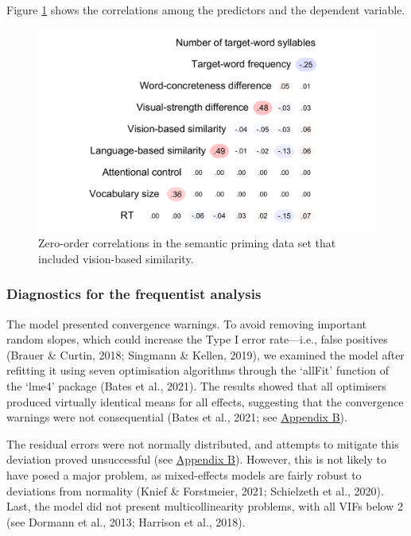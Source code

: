 \documentclass[
  12pt,
  man,floatsintext]{apa7}
\begin{document}
Figure \ref{fig:semanticpriming-with-visualsimilarity-correlations} shows the correlations among the predictors and the dependent variable.

\begin{figure}

{\centering \includegraphics[width=0.73\linewidth]{manuscript_files/figure-latex/semanticpriming-with-visualsimilarity-correlations-1} 

}

\caption{Zero-order correlations in the semantic priming data set that included vision-based similarity.}\label{fig:semanticpriming-with-visualsimilarity-correlations}
\end{figure}

\hypertarget{diagnostics-for-the-frequentist-analysis-1}{%
\subsubsection{Diagnostics for the frequentist analysis}\label{diagnostics-for-the-frequentist-analysis-1}}

The model presented convergence warnings. To avoid removing important random slopes, which could increase the Type I error rate---i.e., false positives (Brauer \& Curtin, 2018; Singmann \& Kellen, 2019), we examined the model after refitting it using seven optimisation algorithms through the `allFit' function of the `lme4' package (Bates et al., 2021). The results showed that all optimisers produced virtually identical means for all effects, suggesting that the convergence warnings were not consequential (Bates et al., 2021; see \protect\hyperlink{appendix-B-frequentist-analysis-diagnostics}{\underline{Appendix B}}).

The residual errors were not normally distributed, and attempts to mitigate this deviation proved unsuccessful (see \protect\hyperlink{appendix-B-frequentist-analysis-diagnostics}{\underline{Appendix B}}). However, this is not likely to have posed a major problem, as mixed-effects models are fairly robust to deviations from normality (Knief \& Forstmeier, 2021; Schielzeth et al., 2020). Last, the model did not present multicollinearity problems, with all VIFs below 2 (see Dormann et al., 2013; Harrison et al., 2018).
\end{document}
